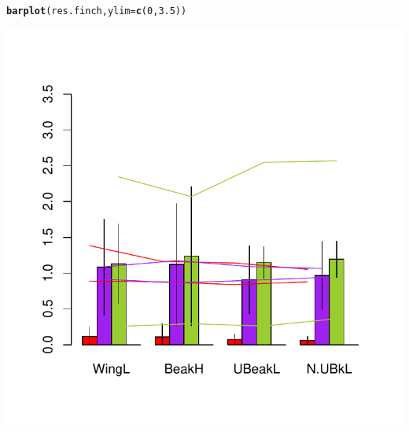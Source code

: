 \documentclass[12pt]{article}\usepackage[]{graphicx}\usepackage[]{color}
\makeatletter
\def\maxwidth{ %
  \ifdim\Gin@nat@width>\linewidth
    \linewidth
  \else
    \Gin@nat@width
  \fi
}
\newcommand{\hlnum}[1]{\textcolor[rgb]{0.686,0.059,0.569}{#1}}%
\newcommand{\hlstd}[1]{\textcolor[rgb]{0.345,0.345,0.345}{#1}}%
\newcommand{\hlkwc}[1]{\textcolor[rgb]{0.333,0.667,0.333}{#1}}%
\newcommand{\hlkwd}[1]{\textcolor[rgb]{0.737,0.353,0.396}{\textbf{#1}}}%
\newenvironment{kframe}{%
 \def\at@end@of@kframe{}%
 \ifinner\ifhmode%
  \def\at@end@of@kframe{\end{minipage}}%
  \begin{minipage}{\columnwidth}%
 \fi\fi%
 \def\FrameCommand##1{\hskip\@totalleftmargin \hskip-\fboxsep
 \colorbox{shadecolor}{##1}\hskip-\fboxsep
     \hskip-\linewidth \hskip-\@totalleftmargin \hskip\columnwidth}%
 \MakeFramed {\advance\hsize-\width
   \@totalleftmargin\z@ \linewidth\hsize
   \@setminipage}}%
 {\par\unskip\endMakeFramed%
 \at@end@of@kframe}
\newenvironment{knitrout}{}{} %
\makeatother
\begin{document}
\newpage

\begin{knitrout}
\color{fgcolor}\begin{kframe}
\begin{alltt}
\hlkwd{barplot}\hlstd{(res.finch,} \hlkwc{ylim}\hlstd{=}\hlkwd{c}\hlstd{(}\hlnum{0}\hlstd{,}\hlnum{3.5}\hlstd{))}
\end{alltt}
\end{kframe}

{\centering \includegraphics[width=\maxwidth]{figure/unnamed-chunk-31} 

}



\end{knitrout}
\end{document}
